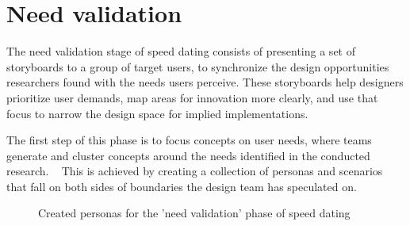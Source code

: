 \section{Need validation}

The need validation stage of speed dating consists of presenting a set of storyboards to a group of target users, to synchronize the design opportunities researchers found with the needs users perceive. These storyboards help designers prioritize user demands, map areas for innovation more clearly, and use that focus to narrow the design space for implied implementations. ~\cite{Davidoff2007}

The first step of this phase is to focus concepts on user needs, where teams generate and cluster concepts around the needs identified in the conducted research. ~\cite{Davidoff2007} This is achieved by creating a collection of personas and scenarios that fall on both sides of boundaries the design team has speculated on. 

\begin{figure}[htbp]
	\centering
	 \qquad
		 \qquad
	\caption{Created personas for the 'need validation' phase of speed dating}
	\label{fig:personas}
\end{figure}



